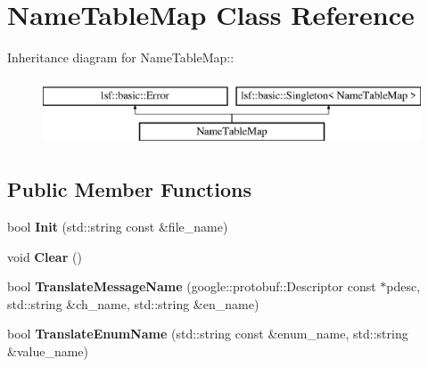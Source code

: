 \hypertarget{classNameTableMap}{
\section{NameTableMap Class Reference}
\label{classNameTableMap}
}
Inheritance diagram for NameTableMap::\begin{figure}[H]
\begin{center}
\leavevmode
\includegraphics[height=2cm]{classNameTableMap}
\end{center}
\end{figure}
\subsection*{Public Member Functions}
\begin{DoxyCompactItemize}
\item 
\hypertarget{classNameTableMap_a214d27d4845d8bf8613bbfb4b0117316}{
bool {\bfseries Init} (std::string const \&file\_\-name)}
\label{classNameTableMap_a214d27d4845d8bf8613bbfb4b0117316}

\item 
\hypertarget{classNameTableMap_ae553aa79487a1bf1a25573c2d641094a}{
void {\bfseries Clear} ()}
\label{classNameTableMap_ae553aa79487a1bf1a25573c2d641094a}

\item 
\hypertarget{classNameTableMap_a09b5392727ccb2bfdc2cc8ac5520f03e}{
bool {\bfseries TranslateMessageName} (google::protobuf::Descriptor const $\ast$pdesc, std::string \&ch\_\-name, std::string \&en\_\-name)}
\label{classNameTableMap_a09b5392727ccb2bfdc2cc8ac5520f03e}

\item 
\hypertarget{classNameTableMap_ab216c3f6a5626ab4a98947cf7946b9f8}{
bool {\bfseries TranslateEnumName} (std::string const \&enum\_\-name, std::string \&value\_\-name)}
\label{classNameTableMap_ab216c3f6a5626ab4a98947cf7946b9f8}

\end{DoxyCompactItemize}
